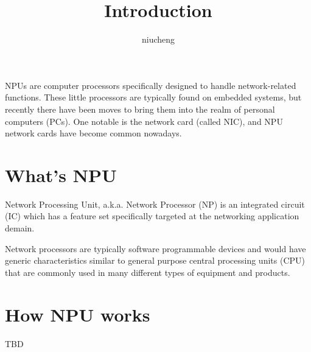 \documentclass[a4paper,12pt]{article}
\author{niucheng}
\title{Introduction}
\begin{document}
\maketitle
\tableofcontents
\cleardoublepage
NPUs are computer processors specifically designed to handle network-related functions. These little processors are typically found on embedded systems, but recently there have been moves to bring them into the realm of personal computers (PCs). One notable is the network card (called NIC), and NPU network cards have become common nowadays.
\section{What's NPU}
Network Processing Unit, a.k.a. Network Processor (NP) is an integrated circuit (IC) which has a feature set specifically targeted at the networking application demain.

Network processors are typically software programmable devices and would have generic characteristics similar to general purpose central processing units (CPU) that are commonly used in many different types of equipment and products.
\section{How NPU works}
TBD
\end{document}

